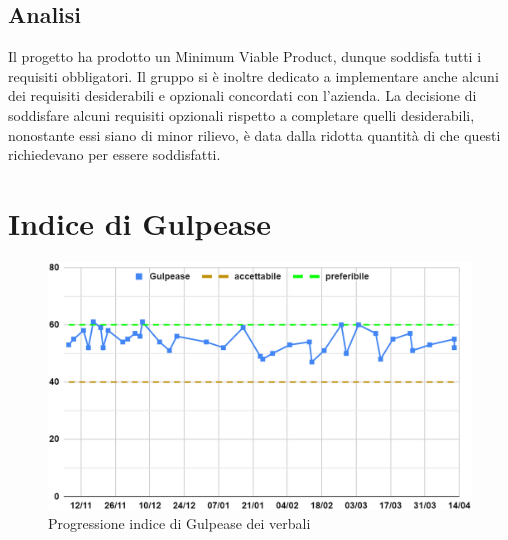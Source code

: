 \subsection{Analisi}
Il progetto ha prodotto un Minimum Viable Product, dunque soddisfa tutti i requisiti obbligatori. Il gruppo si è inoltre dedicato a implementare anche alcuni dei requisiti desiderabili e opzionali concordati con l'azienda. La decisione di soddisfare alcuni requisiti opzionali rispetto a completare quelli desiderabili, nonostante essi siano di minor rilievo, è data dalla ridotta quantità di  che questi richiedevano per essere soddisfatti.
\section{Indice di Gulpease}
\begin{figure}[H]
    \centering
    \includegraphics[width=0.8\linewidth]{GulpeaseVerbaliProgresso.png}
    \caption{Progressione indice di Gulpease dei verbali}
\end{figure}
